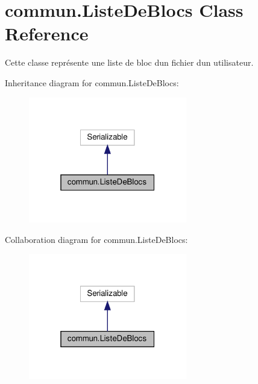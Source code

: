\hypertarget{classcommun_1_1ListeDeBlocs}{}\section{commun.\+Liste\+De\+Blocs Class Reference}
\label{classcommun_1_1ListeDeBlocs}


Cette classe représente une liste de bloc d\textquotesingle{}un fichier d\textquotesingle{}un utilisateur.  




Inheritance diagram for commun.\+Liste\+De\+Blocs\+:\nopagebreak
\begin{figure}[H]
\begin{center}
\leavevmode
\includegraphics[width=196pt]{classcommun_1_1ListeDeBlocs__inherit__graph}
\end{center}
\end{figure}


Collaboration diagram for commun.\+Liste\+De\+Blocs\+:\nopagebreak
\begin{figure}[H]
\begin{center}
\leavevmode
\includegraphics[width=196pt]{classcommun_1_1ListeDeBlocs__coll__graph}
\end{center}
\end{figure}
